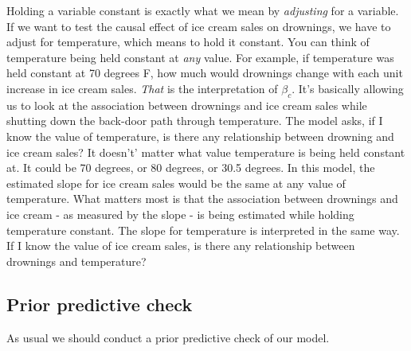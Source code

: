 \documentclass[
]{book}
\begin{document}
Holding a variable constant is exactly what we mean by \emph{adjusting} for a variable. If we want to test the causal effect of ice cream sales on drownings, we have to adjust for temperature, which means to hold it constant. You can think of temperature being held constant at \emph{any} value. For example, if temperature was held constant at 70 degrees F, how much would drownings change with each unit increase in ice cream sales. \emph{That} is the interpretation of \(\beta_c\). It's basically allowing us to look at the association between drownings and ice cream sales while shutting down the back-door path through temperature. The model asks, if I know the value of temperature, is there any relationship between drowning and ice cream sales? It doesn't' matter what value temperature is being held constant at. It could be 70 degrees, or 80 degrees, or 30.5 degrees. In this model, the estimated slope for ice cream sales would be the same at any value of temperature. What matters most is that the association between drownings and ice cream - as measured by the slope - is being estimated while holding temperature constant. The slope for temperature is interpreted in the same way. If I know the value of ice cream sales, is there any relationship between drownings and temperature?

\subsection{Prior predictive check}\label{prior-predictive-check}

As usual we should conduct a prior predictive check of our model.
\end{document}
